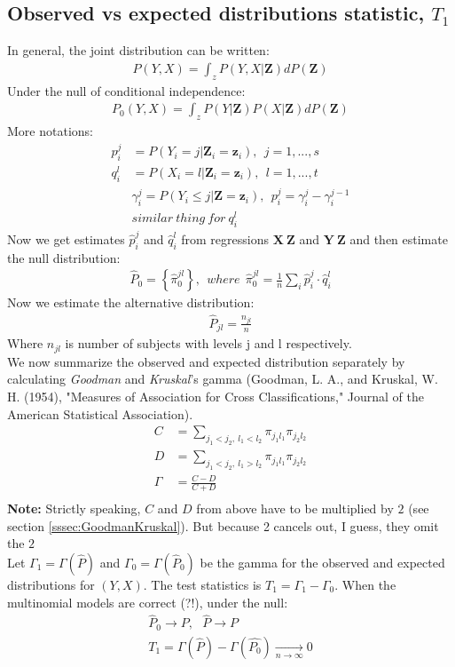 \documentclass[]{article}
\begin{document}
\subsection{Observed vs expected distributions statistic, $T_1$}
In general, the joint distribution can be written:
$$
\begin{aligned}
	P(Y,X) = \int_z P(Y,X|\pmb{Z})dP(\pmb{Z})
\end{aligned}
$$
Under the null of conditional independence:
$$
\begin{aligned}
	P_0(Y,X) = \int_z P(Y|\pmb{Z})P(X|\pmb{Z})dP(\pmb{Z})
\end{aligned}
$$
More notations:
$$
\begin{aligned}
  p_{i}^j &= P(Y_i = j|\pmb{Z}_i = \pmb{z}_i),~~j=1,...,s\\
  q_{i}^l &= P(X_i = l|\pmb{Z}_i = \pmb{z}_i),~~l=1,...,t\\
	&\gamma_i^j=P(Y_i\leq j|\pmb{Z}=\pmb{z}_i), ~~p_{i}^j = \gamma^{j}_i - \gamma^{j-1}_i\\
	 &similar~thing~for~q_i^l
\end{aligned}
$$
Now we get estimates $\hat{p}_i^j$ and $\hat{q}_i^l$ from regressions $\pmb{X~Z}$ and $\pmb{Y~Z}$ and then estimate the null distribution:
$$
\begin{aligned}
  \hat{P}_0 = \left\{\hat{\pi}_0^{jl}\right\},~~where~~\hat{\pi}_0^{jl} = \frac{1}{n}\sum_i \hat{p}_i^j \cdot \hat{q}_i^l
\end{aligned}
$$
Now we estimate the alternative distribution:
$$
\begin{aligned}
  \hat{P}_{jl} = \frac{n_{jl}}{n}
\end{aligned}
$$
Where $n_{jl}$ is number of subjects with levels j and l respectively.\\
We now summarize the observed and expected distribution separately by calculating \emph{Goodman} and \emph{Kruskal}'s gamma \cite{goodman1979measures} (Goodman, L. A., and Kruskal, W. H. (1954), "Measures of Association for Cross Classifications," Journal of the American Statistical Association).
$$
\begin{aligned}
	C&=\sum_{j_1<j_2, ~l_1<l_2}\pi_{j_1l_1}\pi_{j_2l_2}\\
	D&=\sum_{j_1<j_2, ~l_1>l_2}\pi_{j_1l_1}\pi_{j_2l_2}\\
  \Gamma &= \frac{C-D}{C+D}\\
\end{aligned}
$$
{\scriptsize{\textbf{Note:} Strictly speaking, $C$ and $D$ from above have to be multiplied by $2$ (see section \ref{sssec:GoodmanKruskal}). But because 2 cancels out, I guess, they omit the $2$}}\\
Let $\Gamma_1 = \Gamma(\hat{P})$ and  $\Gamma_0 = \Gamma(\hat{P}_0)$ be the gamma for the observed and expected distributions for $(Y,X)$. The test statistics is $T_1=\Gamma_1 - \Gamma_0$. When the multinomial models are correct (?!), under the null:
$$
\begin{aligned}
	\hat{P}_0 \rightarrow P,~~~\hat{P} \rightarrow P\\
	T_1 = \Gamma(\hat{P}) - \Gamma(\hat{P_0}) \underset{n\rightarrow \infty}{\longrightarrow} 0
\end{aligned}
$$
\end{document}
